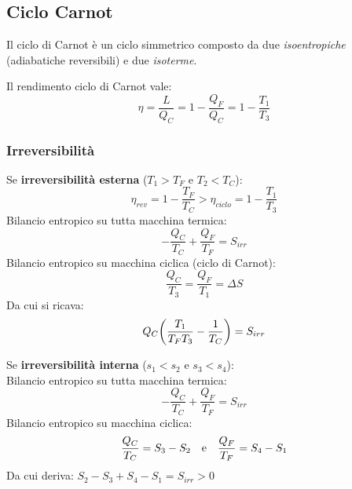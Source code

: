 \subsection{Ciclo Carnot}
Il ciclo di Carnot è un ciclo simmetrico composto da due \textit{isoentropiche} (adiabatiche reversibili) e due \textit{isoterme}.

Il rendimento ciclo di Carnot vale:
\[ \eta = \frac{L}{Q_C} = 1 - \frac{Q_F}{Q_C} = 1 - \frac{T_1}{T_3} \]

\begin{minipage}{.5\linewidth}
\end{minipage}%
\begin{minipage}{.5\linewidth}
\end{minipage}

\subsubsection{Irreversibilità}
Se \textbf{irreversibilità esterna} ($T_1 > T_F$ e $T_2 < T_C$):
\[ \eta_{rev} = 1 - \frac{T_F}{T_C} > \eta_{ciclo} = 1 - \frac{T_1}{T_3} \]
Bilancio entropico su tutta macchina termica:
\[ -\frac{Q_C}{T_C} + \frac{Q_F}{T_F} = S_{irr} \]
Bilancio entropico su macchina ciclica (ciclo di Carnot):
\[ \frac{Q_C}{T_3} = \frac{Q_F}{T_1} = \Delta S \]
Da cui si ricava:
\[ Q_C \qty(\frac{T_1}{T_F T_3} - \frac{1}{T_C}) = S_{irr} \]

Se \textbf{irreversibilità interna} ($s_1 < s_2$ e $s_3 < s_4$):\\
Bilancio entropico su tutta macchina termica:
\[ -\frac{Q_C}{T_C} + \frac{Q_F}{T_F} = S_{irr} \]
Bilancio entropico su macchina ciclica:
\[ \frac{Q_C}{T_C} = S_3 - S_2 \qq{e} \frac{Q_F}{T_F} = S_4 - S_1 \]
Da cui deriva: $S_2 - S_3 + S_4 - S_1 = S_{irr} > 0$
